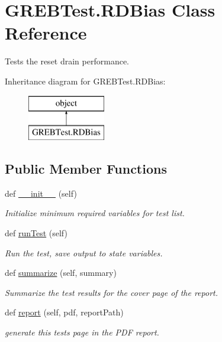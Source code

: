 \hypertarget{class_g_r_e_b_test_1_1_r_d_bias}{}\section{G\+R\+E\+B\+Test.\+R\+D\+Bias Class Reference}
\label{class_g_r_e_b_test_1_1_r_d_bias}


Tests the reset drain performance.  


Inheritance diagram for G\+R\+E\+B\+Test.\+R\+D\+Bias\+:\begin{figure}[H]
\begin{center}
\leavevmode
\includegraphics[height=2.000000cm]{class_g_r_e_b_test_1_1_r_d_bias}
\end{center}
\end{figure}
\subsection*{Public Member Functions}
\begin{DoxyCompactItemize}
\item 
def \hyperlink{class_g_r_e_b_test_1_1_r_d_bias_a03fa3204f1b14c82c6aab46eff1dfc6d}{\+\_\+\+\_\+init\+\_\+\+\_\+} (self)
\begin{DoxyCompactList}\small\item\em Initialize minimum required variables for test list. \end{DoxyCompactList}\item 
def \hyperlink{class_g_r_e_b_test_1_1_r_d_bias_a5c88a3421501fa0f0875a9fb0fc7f8db}{run\+Test} (self)
\begin{DoxyCompactList}\small\item\em Run the test, save output to state variables. \end{DoxyCompactList}\item 
def \hyperlink{class_g_r_e_b_test_1_1_r_d_bias_aa6e369baa9f067780f6588cbf6161470}{summarize} (self, summary)
\begin{DoxyCompactList}\small\item\em Summarize the test results for the cover page of the report. \end{DoxyCompactList}\item 
def \hyperlink{class_g_r_e_b_test_1_1_r_d_bias_ae10f981e67f5b0f8a7f016e28b006866}{report} (self, pdf, report\+Path)
\begin{DoxyCompactList}\small\item\em generate this test\textquotesingle{}s page in the P\+DF report. \end{DoxyCompactList}\end{DoxyCompactItemize}


